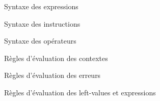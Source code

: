 \begin{figure}
\figstxdata{}
\caption{Syntaxe des expressions}
\end{figure}

\begin{figure}
\figstxinstr{}
\caption{Syntaxe des instructions}
\end{figure}

\begin{figure}[h]
\figstxops{}

\caption{Syntaxe des opérateurs}
\end{figure}

\begin{figure}
\begin{mathpar}
\end{mathpar}

    \figctx{}

\caption{Règles d'évaluation des contextes}
\end{figure}

\begin{figure}

\begin{mathpar}




\end{mathpar}

\caption{Règles d'évaluation des erreurs}
\end{figure}

\begin{figure}

\begin{mathpar}

















\end{mathpar}

\caption{Règles d'évaluation des left-values et expressions }
\end{figure}

